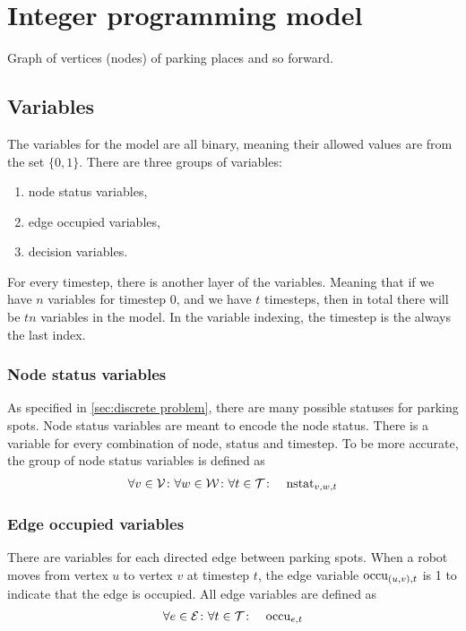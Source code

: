 \section{Integer programming model}
Graph of vertices (nodes) of parking places and so forward.
\subsection{Variables}
The variables for the model are all binary, meaning their allowed values are from the set
$\{0,1\}$. There are three groups of variables:
\begin{enumerate}
    \item node status variables,
    \item edge occupied variables,
    \item decision variables.
\end{enumerate}
For every timestep, there is another layer of the variables. Meaning that if
we have $n$ variables for timestep $0$, and we have $t$ timesteps, then in total
there will be $tn$ variables in the model. In the variable indexing, the
timestep is the always the last index.

\subsubsection{Node status variables}
As specified in \autoref{sec:discrete problem}, there are many possible statuses
for parking spots. Node status variables are meant to encode the node status.
There is a variable for every combination of node, status and timestep. To be
more accurate, the group of node status variables is defined as
\begin{align}
    &\forall v \in \mathcal{V} \colon \forall w \in \mathcal{W} \colon \forall t \in \mathcal{T} \colon &
    \mathrm{nstat}_{v,w,t}
\end{align}

\subsubsection{Edge occupied variables}
There are variables for each directed edge between parking spots. When a robot
moves from vertex $u$ to vertex $v$ at timestep $t$, the edge variable
$\mathrm{occu}_{(u,v),t}$ is 1 to indicate that the edge is occupied. All edge variables
are defined as
\begin{align}
    &\forall e \in \mathcal{E} \colon \forall t \in \mathcal{T} \colon & \mathrm{occu}_{e,t}
\end{align}

